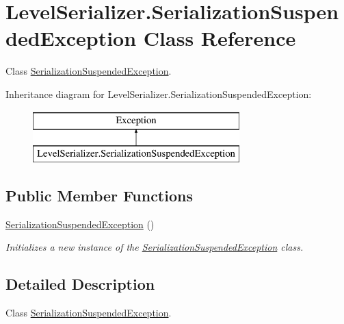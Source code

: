 \hypertarget{class_level_serializer_1_1_serialization_suspended_exception}{}\section{Level\+Serializer.\+Serialization\+Suspended\+Exception Class Reference}
\label{class_level_serializer_1_1_serialization_suspended_exception}


Class \hyperlink{class_level_serializer_1_1_serialization_suspended_exception}{Serialization\+Suspended\+Exception}.  


Inheritance diagram for Level\+Serializer.\+Serialization\+Suspended\+Exception\+:\begin{figure}[H]
\begin{center}
\leavevmode
\includegraphics[height=2.000000cm]{class_level_serializer_1_1_serialization_suspended_exception}
\end{center}
\end{figure}
\subsection*{Public Member Functions}
\begin{DoxyCompactItemize}
\item 
\hyperlink{class_level_serializer_1_1_serialization_suspended_exception_ab59fcf4b9e27e555f603656d3af62b2b}{Serialization\+Suspended\+Exception} ()
\begin{DoxyCompactList}\small\item\em Initializes a new instance of the \hyperlink{class_level_serializer_1_1_serialization_suspended_exception}{Serialization\+Suspended\+Exception} class. \end{DoxyCompactList}\end{DoxyCompactItemize}


\subsection{Detailed Description}
Class \hyperlink{class_level_serializer_1_1_serialization_suspended_exception}{Serialization\+Suspended\+Exception}. 



